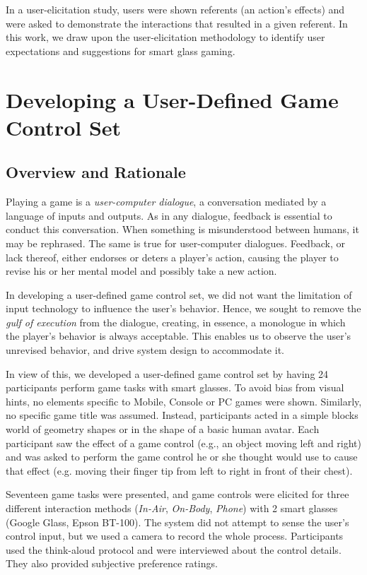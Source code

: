\documentclass{sigchi}
\begin{document}
    In a user-elicitation study, users were shown referents (an action's effects) and were asked to demonstrate the interactions that resulted in a given referent\cite{Wobbrock:2009:UGS:1518701.1518866}. In this work, we draw upon the user-elicitation methodology to identify user expectations and suggestions for smart glass gaming.

\section{Developing a User-Defined Game Control Set}


    \subsection {Overview and Rationale}
    Playing a game is a \textsl{user-computer dialogue}\cite{userComputer}, a conversation mediated by a language of inputs and outputs. As in any dialogue, feedback is essential to conduct this conversation. When something is misunderstood between humans, it may be rephrased. The same is true for user-computer dialogues. Feedback, or lack thereof, either endorses or deters a player's action, causing the player to revise his or her mental model and possibly take a new action.

    In developing a user-defined game control set, we did not want the limitation of input technology to influence the user's behavior. Hence, we sought to remove the \textsl{gulf of execution}\cite{gulf} from the dialogue, creating, in essence, a monologue in which the player's behavior is always acceptable. This enables us to observe the user's unrevised behavior, and drive system design to accommodate it.

    In view of this, we developed a user-defined game control set by having 24 participants perform game tasks with smart glasses. To avoid bias from visual hints\cite{Epps:2006:SHS:1125451.1125601}, no elements specific to Mobile, Console or PC games were shown. Similarly, no specific game title was assumed. Instead, participants acted in a simple blocks world of geometry shapes or in the shape of a basic human avatar. Each participant saw the effect of a game control (e.g., an object moving left and right) and was asked to perform the game control he or she thought would use to cause that effect (e.g. moving their finger tip from left to right in front of their chest). 

    Seventeen game tasks were presented, and game controls were elicited for three different interaction methods (\emph{In-Air}, \emph{On-Body}, \emph{Phone}) with 2 smart glasses (Google Glass, Epson BT-100). The system did not attempt to sense the user's control input, but we used a camera to record the whole process. Participants used the think-aloud protocol and were interviewed about the control details. They also provided subjective preference ratings.
\end{document}
